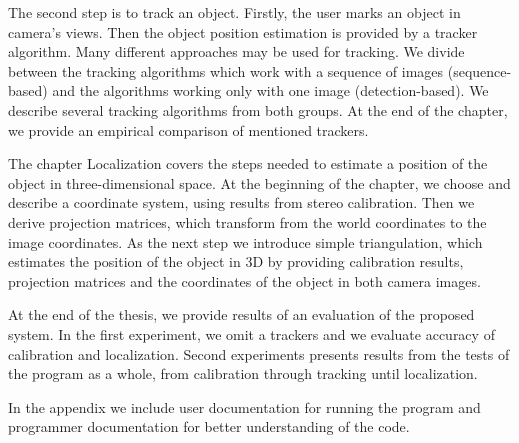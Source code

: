 The second step is to track an object. Firstly, the user marks an object in
camera's views. Then the object position estimation is provided by a tracker
algorithm. Many different approaches may be used for tracking. We divide
between the tracking algorithms which work with a sequence of images
(sequence-based) and the algorithms working only with one image
(detection-based). We describe several tracking algorithms from both groups. At
the end of the chapter, we provide an empirical comparison of mentioned trackers.

The chapter Localization covers the steps needed to estimate a position of the
object in three-dimensional space. At the beginning of the chapter, we choose
and describe a coordinate system, using results from stereo calibration. Then we
derive projection matrices, which transform from the world coordinates to the
image coordinates. As the next step we introduce simple triangulation, which
estimates the position of the object in 3D by providing calibration results,
projection matrices and the coordinates of the object in both camera images.

At the end of the thesis, we provide results of an evaluation of the proposed
system. In the first experiment, we omit a trackers and we evaluate accuracy
of calibration and localization. Second experiments presents results from the
tests of the program as a whole, from calibration through tracking until
localization. 

In the appendix we include user documentation for running the program and
programmer documentation for better understanding of the code.
